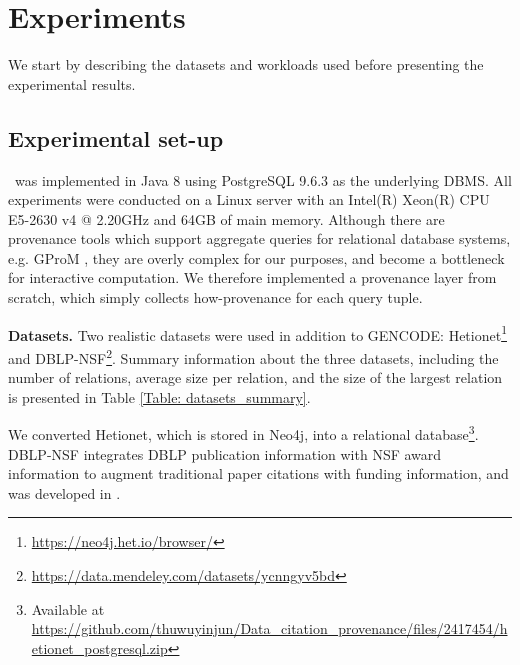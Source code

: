 \section{Experiments}
\label{sec:experiments}
We start by describing the datasets and workloads used before presenting the experimental results. 

\subsection{Experimental set-up}
\provalg\ was implemented in Java 8 using PostgreSQL 9.6.3 as the underlying DBMS. All experiments were conducted
on a Linux server with an Intel(R) Xeon(R) CPU E5-2630 v4 @ 2.20GHz and 64GB of main memory. 
Although there are provenance tools which support aggregate queries for relational database systems, e.g. GProM \cite{arab2018gprom}, they are overly complex for our purposes, and become a bottleneck for interactive computation. We therefore implemented a provenance layer from scratch, which simply collects how-provenance \cite{green2007provenance, amsterdamer2011provenance} for each query tuple.


{\bf Datasets.} %
Two realistic datasets were used in addition to GENCODE: 
Hetionet\footnote{\url{https://neo4j.het.io/browser/}} and DBLP-NSF\footnote{\url{https://data.mendeley.com/datasets/ycnngyv5bd}}\cite{nsf_dblp}. 
Summary information about the three datasets, including the number of relations, average size per relation, and the size of the largest relation is presented in Table \ref{Table: datasets_summary}.

We converted Hetionet, which is stored in Neo4j, into a relational database\footnote{Available at 
\url{https://github.com/thuwuyinjun/Data_citation_provenance/files/2417454/hetionet_postgresql.zip}}.
DBLP-NSF integrates DBLP publication information with NSF award information to augment traditional paper citations with funding information, and was developed in \cite{wu2018data}.

